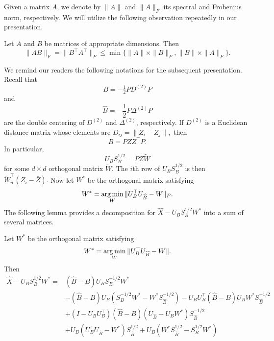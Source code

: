 Given a matrix $A$, we denote by $\| A \|$ and $\|A\|_{F}$ its spectral and Frobenius norm, respectively.
We will utilize the following observation repeatedly in our presentation.
\begin{observation}
\label{appthm1}
 Let $A$ and $B$ be matrices of appropriate dimensions. Then 
 $$\|A B\|_F = \|B^{\top} A^{\top}\|_{F} \leq \min\{ \|A\| \times \|B\|_F, \|B\| \times \|A\|_{F}\}.$$
\end{observation}

We remind our readers the following notations for the subsequent presentation. 
 Recall that 
 $$B = -\tfrac{1}{2} P D^{(2)} P$$ 
 and $$\hat{B} = -\frac{1}{2} P \Delta^{(2)} P$$
  are the double centering of $D^{(2)}$ and $\Delta^{(2)}$, respectively. If $D^{(2)}$ 
is a Euclidean distance matrix whose elements are $D_{ij} = \|Z_i -Z_j\|,$ then $$B = P Z Z^{\top} P.$$ In particular, $$U_B S_B^{1/2} = P Z \tilde{W}$$ for some $d \times d$ orthogonal matrix $\tilde{W}$. The $i$th row of $U_B S_B^{1/2}$ is then $\tilde{W}_n^{\top} (Z_i - \bar{Z}).$ Now let $W^{*}$ be the orthogonal matrix satisfying $$W^{*} = \operatorname*{arg\,min}_{W} \|U_B^{\top} U_{\widehat{B}} - W\|_{F}.$$ 
The following lemma provides a decomposition for $\hat{X} - U_B S_B^{1/2} W^*$ into a sum of several matrices. 
\begin{lemma}
\label{appthm2}
  Let $W^{*}$ be the orthogonal matrix satisfying $$W^{*} = \operatorname*{arg\,min}_{W} \|U_B^{\top} U_{\widehat{B}} - W\|.$$ Then 
      \begin{align}
          \hat{X} - U_B S_B^{1/2} W^*  =&   ( \hat{B} - B) U_B S_B^{-1/2} W^{*}  \label{term1}\\
          & - (\hat{B} - B) U_B (S_{B}^{-1/2} W^{*} - W^{*} S_{\hat{B}}^{-1/2})  - U_B U_B^{\top} (\hat{B} - B) U_B W^* S_{\hat{B}}^{-1/2}      \label{term3}\\
          & + (I - U_B U_B^{\top}) (\hat{B} - B) (U_{\hat{B}} - U_B W^{*}) S_{\hat{B}}^{-1/2}     \label{term4}\\
          & + U_B (U_B^{\top} U_{\hat{B}} - W^*) S_{\hat{B}}^{1/2} + U_B (W^{*} S_{\hat{B}}^{1/2} - S_B^{1/2} W^{*})     \label{term6}
    \end{align}
\end{lemma}
